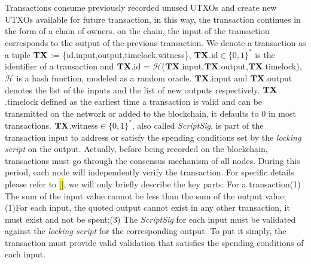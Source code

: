 \documentclass[conference]{IEEEtran}
\begin{document}
 Transactions consume previously recorded unused UTXOs and create new UTXOs available for future transaction, in this way, the 
 transaction continues in the form of a chain of owners. on the chain, the input of the transaction corresponds to the output 
 of the previous transaction. We denote a transaction as a tuple $\bf TX$ := \{id,input,output,timelock,witness\}, $\bf TX$.id$\in\{0,1\}^*$
 is the identifier of a transaction and $\bf TX$.id = $\mathcal H$($\bf TX$.input,$\bf TX$.output,$\bf TX$.timelock), $\mathcal H$ is a hash function,
 modeled as a random oracle. $\bf TX$.input and $\bf TX$.output denotes the list of the inputs and the list of new outputs respectively.
 $\bf TX$.timelock defined as the earliest time a transaction is valid and can be transmitted on the network or added to the blockchain, 
 it defaults to 0 in most transactions. $\bf TX$.witness$\in\{0,1\}^*$, also called \emph{ScriptSig}, is part of the transaction input to address or satisfy the spending 
 conditions set by the \emph{locking script} on the output. Actually, before being recorded on the blockchain, transactions must go
 through the consensus mechanism of all nodes. During this period, each node will independently verify the transaction. For specific 
 details please refer to \colorbox{yellow}{[]}, we will only briefly describe the key parts: For a transaction(1) The sum of the input value cannot be less 
 than the sum of the output value;(1)For each input, the quoted output cannot exist in any other transaction, it must exist and not 
 be spent;(3) The \emph{ScriptSig} for each input must be validated against the \emph{locking script} for the corresponding output.
 To put it simply, the transaction must provide valid validation that satisfies the spending conditions of each input.
\end{document}
